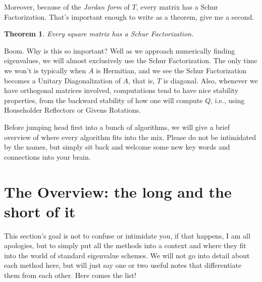 \documentclass[paper=a4, fontsize=11pt]{scrartcl} %
\newtheorem{theorem}{Theorem}
\numberwithin{equation}{section} %
\numberwithin{figure}{section} %
\numberwithin{table}{section} %
\begin{document}
\begin{enumerate}
Moreover, because of the \emph{Jordan form} of $T$, every matrix has a Schur Factorization. That's important enough to write as a theorem, give me a second. 

\begin{theorem} Every square matrix has a Schur Factorization.
\end{theorem}

Boom. Why is this so important? Well as we approach numerically finding eigenvalues, we will almost exclusively use the Schur Factorization. The only time we won't is typically when $A$ is Hermitian, and we see the Schur Factorization becomes a Unitary Diagonalization of  $A$, that is, $T$ is diagonal. Also, whenever we have orthogonal matrices involved, computations tend to have nice stability properties, from the backward stability of how one will compute $Q$, i.e., using Householder Reflectors or Givens Rotations. 

\end{enumerate}

Before jumping head first into a bunch of algorithms, we will give a brief overview of where every algorithm fits into the mix. Please do not be intimidated by the names, but simply sit back and welcome some new key words and connections into your brain.



%
%

\section{The Overview: the long and the short of it}

This section's goal is not to confuse or intimidate you, if that happens, I am all apologies, but to simply put all the methods into a context and where they fit into the world of standard eigenvalue schemes. We will not go into detail about each method here, but will just say one or two useful notes that differentiate them from each other. Here comes the list!
\end{document}

